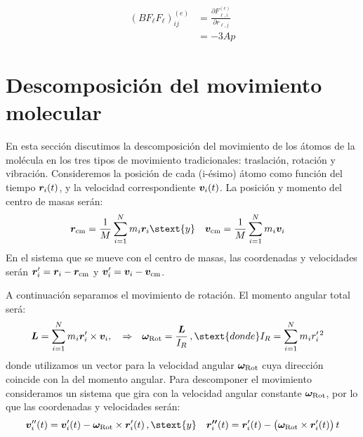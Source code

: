 \begin{align}
  (BF_{\ell}F_{\ell})^{(e)}_{ij} &= \frac{\partial F^{(e)}_{\ell,i}}{\partial r_{\ell,j}} \\&= -3 A p 
\end{align}

\section{Descomposici\'{o}n del movimiento molecular}
\label{S:desc-movim-molec}

En esta secci\'{o}n discutimos la descomposici\'{o}n del movimiento de los \'{a}tomos de la mol\'{e}cula en los tres tipos de movimiento tradicionales: traslaci\'{o}n, rotaci\'{o}n y vibraci\'{o}n. Consideremos la posici\'{o}n de cada (i-\'{e}simo) \'{a}tomo como funci\'{o}n del tiempo $\bm{r}_{i}(t)$, y la velocidad correspondiente $\bm{v}_{i}(t)$. 
La posici\'{o}n y momento del centro de masas ser\'{a}n:
\begin{align*}
  \vect{r}_{\text{cm}}&= \frac{1}{M} \sum_{i=1}^{N} m_{i} \vect{r}_{i}  \stext{ y } & \vect{v}_{\text{cm}}&= \frac{1}{M} \sum_{i=1}^{N} m_{i} \vect{v}_{i}
\end{align*}
%
En el sistema que se mueve con el centro de masas, las coordenadas y velocidades ser\'{a}n $\bm{r}'_{i}= \bm{r}_{i} - \bm{r}_{\text{cm}}$ y $\bm{v}'_{i}= \bm{v}_{i} - \bm{v}_{\text{cm}}$.

A continuaci\'{o}n separamos el movimiento de rotaci\'{o}n. El momento angular total ser\'{a}:
\begin{align*}
  \vect{L}&= \sum_{i=1}^{N} m_{i} \vect{r}'_{i} \times \vect{v}_{i},  \quad\Rightarrow & {\bomega}_{\text{Rot}}= \frac{\vect{L}}{I_{R}} \,, \stext{ donde } & I_{R} = \sum_{i=1}^{N} m_{i} r'^{\,2}_{i}
\end{align*}
donde utilizamos un vector para la velocidad angular $\boldsymbol{\omega}_{\text{Rot}}$ cuya direcci\'{o}n coincide con la del momento angular. Para descomponer el movimiento consideramos un sistema que gira con la velocidad angular constante $\boldsymbol{\omega}_{\text{Rot}}$, por lo que las coordenadas y velocidades ser\'{a}n:
\begin{align*}
\vect{v}_{i}''(t) &= \vect{v}_{i}'(t) -  \bomega_{\text{Rot}} \times \vect{r}'_{i}(t)\,, \stext{y}
&  \vect{r''}_{i}(t) = \vect{r}_{i}'(t) - \bigl(\bomega_{\text{Rot}} \times \vect{r}'_{i}(t)\bigr) \, t
\end{align*}

